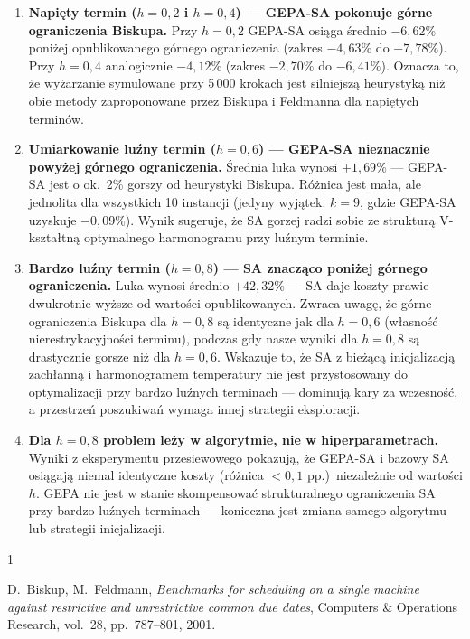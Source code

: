 \documentclass[11pt,a4paper]{article}
\begin{document}
\begin{enumerate}[label=\arabic*.]
  \item \textbf{Napięty termin ($h = 0{,}2$ i $h = 0{,}4$) — GEPA-SA
        pokonuje górne ograniczenia Biskupa.}
        Przy $h = 0{,}2$ GEPA-SA osiąga średnio $-6{,}62\%$ poniżej opublikowanego
        górnego ograniczenia (zakres $-4{,}63\%$ do $-7{,}78\%$).
        Przy $h = 0{,}4$ analogicznie $-4{,}12\%$ (zakres $-2{,}70\%$ do $-6{,}41\%$).
        Oznacza to, że wyżarzanie symulowane przy 5\,000 krokach jest silniejszą
        heurystyką niż obie metody zaproponowane przez Biskupa i Feldmanna
        dla napiętych terminów.

  \item \textbf{Umiarkowanie luźny termin ($h = 0{,}6$) — GEPA-SA nieznacznie
        powyżej górnego ograniczenia.}
        Średnia luka wynosi $+1{,}69\%$ — GEPA-SA jest o ok.\ 2\% gorszy od
        heurystyki Biskupa.  Różnica jest mała, ale jednolita dla wszystkich
        10 instancji (jedyny wyjątek: $k = 9$, gdzie GEPA-SA uzyskuje $-0{,}09\%$).
        Wynik sugeruje, że SA gorzej radzi sobie ze strukturą V-kształtną
        optymalnego harmonogramu przy luźnym terminie.

  \item \textbf{Bardzo luźny termin ($h = 0{,}8$) — SA znacząco poniżej
        górnego ograniczenia.}
        Luka wynosi średnio $+42{,}32\%$ — SA daje koszty prawie dwukrotnie
        wyższe od wartości opublikowanych.
        Zwraca uwagę, że górne ograniczenia Biskupa dla $h = 0{,}8$ są
        identyczne jak dla $h = 0{,}6$ (własność nierestrykacyjności terminu),
        podczas gdy nasze wyniki dla $h = 0{,}8$ są drastycznie gorsze niż
        dla $h = 0{,}6$.
        Wskazuje to, że SA z bieżącą inicjalizacją zachłanną i harmonogramem
        temperatury nie jest przystosowany do optymalizacji przy bardzo luźnych
        terminach — dominują kary za wczesność, a przestrzeń poszukiwań
        wymaga innej strategii eksploracji.

  \item \textbf{Dla $h = 0{,}8$ problem leży w algorytmie, nie w hiperparametrach.}
        Wyniki z eksperymentu przesiewowego pokazują, że GEPA-SA i bazowy SA
        osiągają niemal identyczne koszty (różnica $< 0{,}1$ pp.)\ niezależnie
        od wartości $h$.
        GEPA nie jest w stanie skompensować strukturalnego ograniczenia SA
        przy bardzo luźnych terminach — konieczna jest zmiana samego algorytmu
        lub strategii inicjalizacji.
\end{enumerate}

\begin{thebibliography}{1}

D.~Biskup, M.~Feldmann,
\textit{Benchmarks for scheduling on a single machine against restrictive and
unrestrictive common due dates},
Computers \& Operations Research, vol.~28, pp.~787--801, 2001.

\end{thebibliography}
\end{document}
